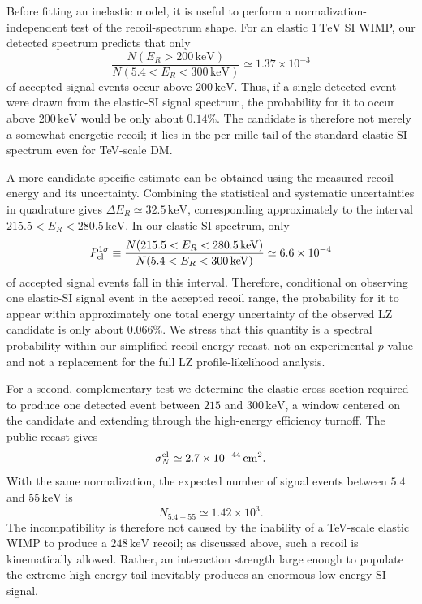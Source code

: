 \documentclass[aps,prd,reprint,superscriptaddress,nofootinbib,longbibliography,floatfix]{revtex4-2}
\newcommand{\TeV}{\mathrm{TeV}}
\newcommand{\keV}{\mathrm{keV}}
\begin{document}
Before fitting an inelastic model, it is useful to perform a normalization-independent test of the recoil-spectrum shape. For an elastic $1\,\TeV$ SI WIMP, our detected spectrum predicts that only
\begin{equation}
\frac{N(E_R>200\,\keV)}{N(5.4<E_R<300\,\keV)}\simeq1.37\times10^{-3}
\label{eq:elastictailfraction}
\end{equation}
of accepted signal events occur above $200\,\keV$. Thus, if a single detected event were drawn from the elastic-SI signal spectrum, the probability for it to occur above $200\,\keV$ would be only about $0.14\%$. The candidate is therefore not merely a somewhat energetic recoil; it lies in the per-mille tail of the standard elastic-SI spectrum even for TeV-scale DM.

A more candidate-specific estimate can be obtained using the measured recoil energy and its uncertainty. Combining the statistical and systematic uncertainties in quadrature gives $\Delta E_R\simeq32.5\,\keV$, corresponding approximately to the interval $215.5<E_R<280.5\,\keV$. In our elastic-SI spectrum, only
\begin{equation}
P_{\rm el}^{1\sigma}\equiv\frac{N(215.5<E_R<280.5\,\keV)}{N(5.4<E_R<300\,\keV)}\simeq6.6\times10^{-4}
\end{equation}
of accepted signal events fall in this interval. Therefore, conditional on observing one elastic-SI signal event in the accepted recoil range, the probability for it to appear within approximately one total energy uncertainty of the observed LZ candidate is only about $0.066\%$. We stress that this quantity is a spectral probability within our simplified recoil-energy recast, not an experimental $p$-value and not a replacement for the full LZ profile-likelihood analysis.

For a second, complementary test we determine the elastic cross section required to produce one detected event between $215$ and $300\,\keV$, a window centered on the candidate and extending through the high-energy efficiency turnoff. The public recast gives
\begin{equation}
\sigma_N^{\rm el}\simeq2.7\times10^{-44}\,\mathrm{cm}^2.
\end{equation}
With the same normalization, the expected number of signal events between $5.4$ and $55\,\keV$ is
\begin{equation}
N_{5.4-55}\simeq1.42\times10^{3}.
\label{eq:elasticcatastrophe}
\end{equation}
The incompatibility is therefore not caused by the inability of a TeV-scale elastic WIMP to produce a $248\,\keV$ recoil; as discussed above, such a recoil is kinematically allowed. Rather, an interaction strength large enough to populate the extreme high-energy tail inevitably produces an enormous low-energy SI signal.
\end{document}
